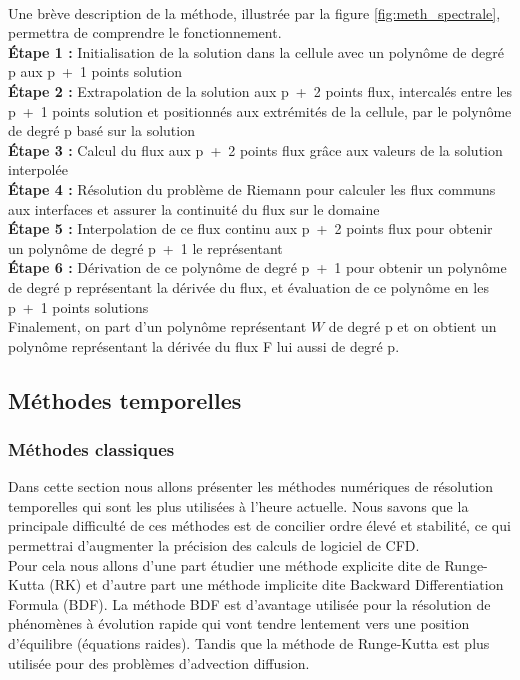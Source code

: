     \paragraph{}
    Une brève description de la méthode, illustrée par la figure \ref{fig:meth_spectrale}, permettra de comprendre le fonctionnement.\\
    \textbf{Étape 1 :} Initialisation de la solution dans la cellule avec un polynôme de degré p aux p~+~1 points solution\\
    \textbf{Étape 2 :} Extrapolation de la solution aux p~+~2 points flux, intercalés entre les p~+~1 points solution et positionnés aux extrémités de la cellule, par le polynôme de degré p basé sur la solution\\
    \textbf{Étape 3 :} Calcul du flux aux p~+~2 points flux grâce aux valeurs de la solution interpolée\\
    \textbf{Étape 4 :} Résolution du problème de Riemann pour calculer les flux communs aux interfaces et assurer la continuité du flux sur le domaine\\
    \textbf{Étape 5 :} Interpolation de ce flux continu aux p~+~2 points flux pour obtenir un polynôme de degré p~+~1 le représentant\\
    \textbf{Étape 6 :} Dérivation de ce polynôme de degré p~+~1 pour obtenir un polynôme de degré p représentant la dérivée du flux, et évaluation de ce polynôme en les p~+~1 points solutions\\
    Finalement, on part d'un polynôme représentant $W$ de degré p et on obtient un polynôme représentant la dérivée du flux F lui aussi de degré p.


\subsection{Méthodes temporelles}
\subsubsection{Méthodes classiques}

Dans cette section nous allons présenter les méthodes numériques de résolution temporelles qui sont les plus utilisées à l'heure actuelle. Nous savons que la principale difficulté de ces méthodes est de concilier ordre élevé et stabilité, ce qui permettrai d'augmenter la précision des calculs de logiciel de CFD. \\ 
Pour cela nous allons d'une part étudier une méthode explicite dite de Runge-Kutta (RK) et d'autre part une méthode implicite dite Backward Differentiation Formula (BDF).
La méthode BDF est d'avantage utilisée pour la résolution de phénomènes à évolution rapide qui vont tendre lentement vers une position d'équilibre (équations raides). Tandis que la méthode de Runge-Kutta est plus utilisée pour des problèmes d'advection diffusion. 

